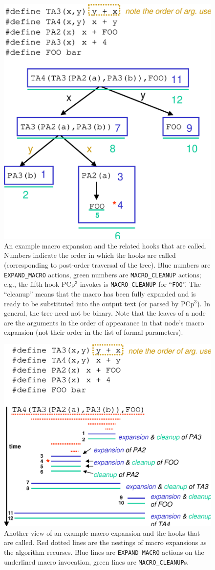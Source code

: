 \documentclass{article}
\newcommand{\pcp}{\mbox{\textsf{PCp}$^3$}}
\newcommand{\eg}{e.g.,}
\begin{document}
\begin{figure}[p]
  \begin{center}
    \leavevmode
    \includegraphics[width=0.45\linewidth]{figs/tree-expn.eps}
    \caption{An example macro expansion and the related
      hooks that are called. Numbers indicate the order in which the
      hooks are called (corresponding to post-order traversal of the
      tree). Blue numbers are \texttt{EXPAND\_MACRO} actions, green
      numbers are \texttt{MACRO\_CLEANUP} actions; \eg{} the fifth hook
      \pcp{} invokes is \texttt{MACRO\_CLEANUP} for ``\texttt{FOO}''.
      The ``cleanup'' means that the macro has been fully expanded and
      is ready to be substituted into the output text (or parsed by
      \pcp{}). In general, the tree need not be
      binary. Note that the leaves of a node are the arguments in the
      order of appearance in that node's macro expansion (not their
      order in the list of formal parameters).}
    \label{fig:tree-expn}
  \end{center}
\end{figure}

\begin{figure}[p]
  \begin{center}
    \leavevmode
    \includegraphics[width=0.45\linewidth]{figs/text-expn.eps}
    \caption{Another view of an example macro expansion and the hooks
    that are called.  Red dotted lines are the nestings of macro
    expansions as the algorithm recurses.  Blue lines are
    \texttt{EXPAND\_MACRO} actions on the underlined macro invocation,
    green lines are \texttt{MACRO\_CLEANUP}s.}
    \label{fig:text-expn}
  \end{center}
\end{figure}
\end{document}
